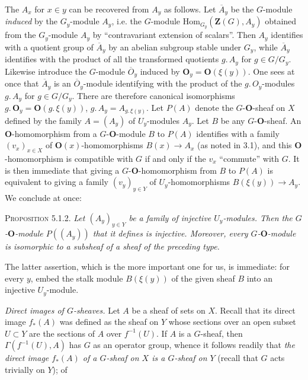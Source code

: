 The $A_x$ for $x\in y$ can be recovered from $A_y$ as follows. Let
$\overline A_y$ be the $G$-module \textit{induced} by the $G_y$-module $A_y$,
i.e. the $G$-module $\mathrm{Hom}_{G_y}(\mathbf Z(G),A_y)$ obtained from the
$G_y$-module $A_y$ by ``contravariant extension of scalars''. Then $A_y$
identifies with a quotient group of $\overline A_y$ by an abelian subgroup
stable under $G_y$, while $\overline A_y$ identifies with the product of all
the transformed quotients $g.\,A_y$ for $g\in G/G_y$.
Likewise introduce the $G$-module $\overline O_y$ induced by
${\mathbf O}_y={\mathbf O}(\xi(y))$. One sees at once that $\overline A_y$ is an
$\overline O_y$-module identifying with the product of the
$g.\,O_y$-modules $g.\,A_y$ for $g\in G/G_y$. There
are therefore canonical isomorphisms $g.\,{\mathbf O}_y={\mathbf O}(g.\,\xi(y))$, $g.\,A_y=A_{g.\,\xi(y)}$.
Let $P(A)$ denote the $G$-${\mathbf O}$-sheaf on $X$ defined by the family
$A=(A_y)$ of $U_y$-modules $A_y$.
Let $B$ be any $G$-${\mathbf O}$-sheaf. An ${\mathbf O}$-homomorphism from a $G$-${\mathbf O}$-module $B$
to $P(A)$ identifies with a family $(v_x)_{x\in X}$ of
${\mathbf O}(x)$-homomorphisms $B(x)\to A_x$ (as noted in 3.1), and this
${\mathbf O}$-homomorphism is compatible with $G$ if and only if the $v_x$ ``commute''
with $G$. It is then immediate that giving a $G$-${\mathbf O}$-homomorphism from $B$ to
$P(A)$ is equivalent to giving a family $(v_y)_{y\in Y}$ of
$U_y$-homomorphisms $B(\xi(y))\to A_y$. We conclude at once:

\textsc{Proposition 5.1.2.} \textit{Let $(A_y)_{y\in Y}$ be a
family of injective $U_y$-modules. Then the $G$-${\mathbf O}$-module $P((A_y))$ that it
defines is injective. Moreover, every $G$-${\mathbf O}$-module is isomorphic to a
subsheaf of a sheaf of the preceding type.}

The latter assertion, which is the more important one for us, is immediate:
for every $y$, embed the stalk module $B(\xi(y))$ of the given sheaf $B$ into
an injective $U_y$-module.

\textit{Direct images of $G$-sheaves.} Let $A$ be a sheaf of sets on
$X$. Recall that its direct image $f_*(A)$ was defined as the sheaf on $Y$
whose sections over an open subset $U\subset Y$ are the sections of $A$ over
$f^{-1}(U)$. If $A$ is a $G$-sheaf, then $\Gamma(f^{-1}(U),A)$ has $G$ as an
operator group, whence it follows readily that \textit{the direct image
$f_*(A)$ of a $G$-sheaf on $X$ is a $G$-sheaf on $Y$} (recall that $G$ acts
trivially on $Y$); of


